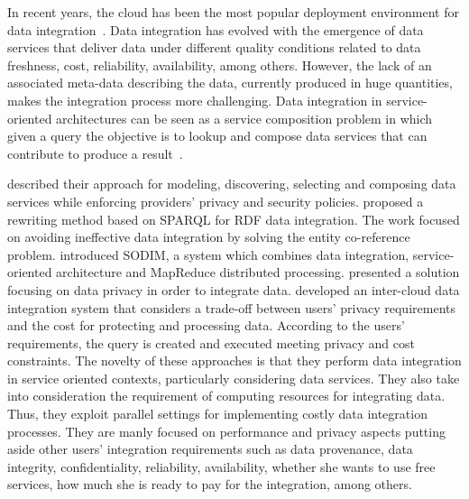 In recent years, the cloud has been the most popular deployment environment for data integration~\cite{Carvalho2015}.
Data integration has evolved with the emergence of data services that deliver data under different quality conditions related to data freshness, cost, reliability, availability, among others. 
%
However, the lack of an associated meta-data describing the data, currently produced in huge quantities, makes the integration process more challenging. 
%
Data integration in service-oriented architectures can be seen as a service composition problem in which given a query the objective is to lookup and compose data services that can contribute to produce a result~\cite{Benslimane:2013, Correndo2010, ElSheikh2013, Tian2010, YauY08}. 
%

\cite{Benslimane:2013} described their approach for modeling, discovering, selecting and composing data services while enforcing providers' privacy and security policies.
\cite{Correndo2010} proposed a rewriting method based on SPARQL for RDF data integration. The work focused on avoiding ineffective data integration by solving the entity co-reference problem. \cite{ElSheikh2013} introduced SODIM, a system which combines data integration, service-oriented architecture and MapReduce distributed processing. \cite{YauY08} presented a solution focusing on data privacy in order to integrate data. \cite{Tian2010} developed an inter-cloud data integration system that considers a trade-off between users' privacy requirements and the cost for protecting and processing data. According to the users' requirements, the query is created and executed meeting privacy and cost constraints. The novelty of these approaches is that they perform data integration in service oriented contexts, particularly considering data services. They also take into consideration the requirement of computing resources for integrating data. Thus, they exploit parallel settings for implementing costly data integration processes. They are manly focused on performance and privacy aspects putting aside other users' integration requirements such as data provenance, data integrity, confidentiality, reliability, availability, whether she wants to use free services, how much she is ready to pay for the integration, among others. 
%


